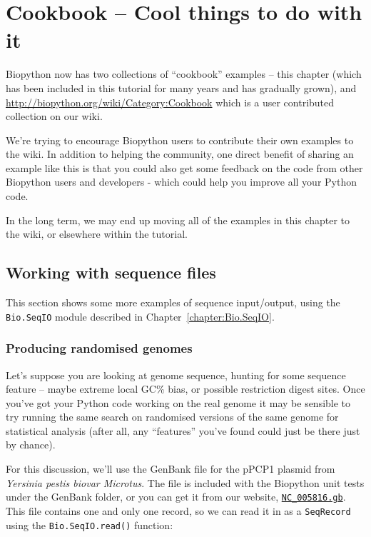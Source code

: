 \documentclass{report}
\begin{document}
\chapter{Cookbook -- Cool things to do with it}
\label{chapter:cookbook}

Biopython now has two collections of ``cookbook'' examples -- this chapter
(which has been included in this tutorial for many years and has gradually
grown), and \url{http://biopython.org/wiki/Category:Cookbook} which is a
user contributed collection on our wiki.

We're trying to encourage Biopython users to contribute their own examples
to the wiki. In addition to helping the community, one direct benefit of
sharing an example like this is that you could also get some feedback on
the code from other Biopython users and developers - which could help you
improve all your Python code.

In the long term, we may end up moving all of the examples in this chapter
to the wiki, or elsewhere within the tutorial.

\section{Working with sequence files}
\label{seq:cookbook-sequences}

This section shows some more examples of sequence input/output, using the
\verb|Bio.SeqIO| module described in Chapter~\ref{chapter:Bio.SeqIO}.

\subsection{Producing randomised genomes}

Let's suppose you are looking at genome sequence, hunting for some sequence
feature -- maybe extreme local GC\% bias, or possible restriction digest sites.
Once you've got your Python code working on the real genome it may be sensible
to try running the same search on randomised versions of the same genome for
statistical analysis (after all, any ``features'' you've found could just be
there just by chance).

For this discussion, we'll use the GenBank file for the pPCP1 plasmid from
\textit{Yersinia pestis biovar Microtus}.  The file is included with the
Biopython unit tests under the GenBank folder, or you can get it from our
website, \href{http://biopython.org/SRC/biopython/Tests/GenBank/NC_005816.gb}
{\texttt{NC\_005816.gb}}.  
This file contains one and only one record, so we can read it in as a
\verb|SeqRecord| using the \verb|Bio.SeqIO.read()| function:
\end{document}
